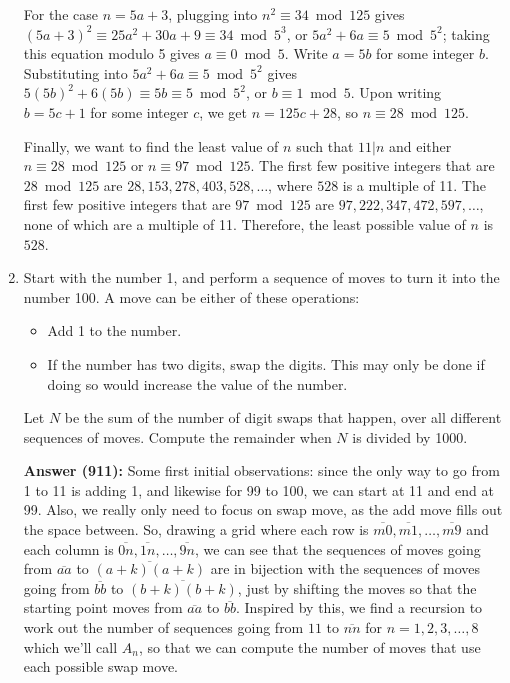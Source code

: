 \documentclass{article}
\begin{document}
\begin{enumerate}
For the case $n = 5a+3$, plugging into $n^2 \equiv 34 \bmod 125$ gives $(5a+3)^2 \equiv 25a^2+30a+9 \equiv 34 \bmod 5^3$, or $5a^2+6a \equiv 5 \bmod 5^2$; taking this equation modulo 5 gives $a \equiv 0 \bmod 5$. Write $a = 5b$ for some integer $b$. Substituting into $5a^2+6a \equiv 5 \bmod 5^2$ gives $5(5b)^2+6(5b) \equiv 5b \equiv 5 \bmod 5^2$, or $b \equiv 1 \bmod 5$. Upon writing $b = 5c+1$ for some integer $c$, we get $n = 125c+28$, so $n \equiv 28 \bmod 125$.

Finally, we want to find the least value of $n$ such that $11 | n$ and either $n \equiv 28 \bmod 125$ or $n \equiv 97 \bmod 125$. The first few positive integers that are $28 \bmod 125$ are $28, 153, 278, 403, 528, \ldots$, where $528$ is a multiple of 11. The first few positive integers that are $97 \bmod 125$ are $97, 222, 347, 472, 597, \ldots$, none of which are a multiple of 11. Therefore, the least possible value of $n$ is $\boxed{528}$.

\item Start with the number 1, and perform a sequence of moves to turn it into the number 100. A move can be either of these operations:

\begin{itemize}
    \item Add 1 to the number.
    \item If the number has two digits, swap the digits. This may only be done if doing so would increase the value of the number.
\end{itemize}

Let $N$ be the sum of the number of digit swaps that happen, over all different sequences of moves. Compute the remainder when $N$ is divided by 1000. 

\textbf{Answer (911):} Some first initial observations: since the only way to go from 1 to 11 is adding 1, and likewise for 99 to 100, we can start at 11 and end at 99. Also, we really only need to focus on swap move, as the add move fills out the space between. So, drawing a grid where each row is $\overline{m0}, \overline{m1}, \ldots, \overline{m9}$ and each column is $\overline{0n}, \overline{1n}, \ldots, \overline{9n}$, we can see that the sequences of moves going from $\overline{aa}$ to $\overline{(a+k)(a+k)}$ are in bijection with the sequences of moves going from $\overline{bb}$ to $\overline{(b+k)(b+k)}$, just by shifting the moves so that the starting point moves from $\overline{aa}$ to $\overline{bb}$. Inspired by this, we find a recursion to work out the number of sequences going from $11$ to $\overline{nn}$ for $n=1,2,3,\ldots,8$ which we'll call $A_n$, so that we can compute the number of moves that use each possible swap move.


\end{enumerate}
\end{document}
